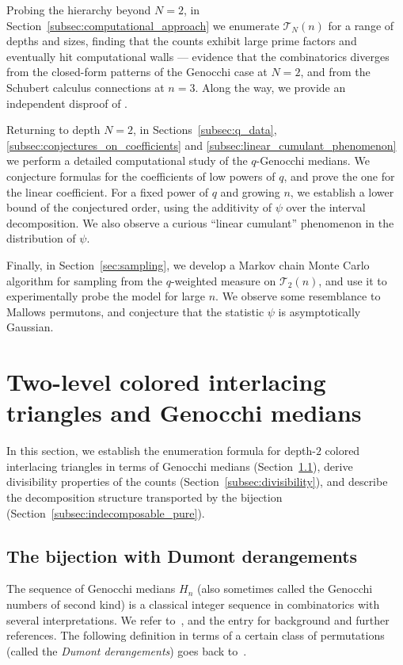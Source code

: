 \documentclass[10pt,a4paper]{amsart}
\numberwithin{equation}{section}
\theoremstyle{definition}
\begin{document}
Probing the hierarchy beyond $N=2$, in Section~\ref{subsec:computational_approach} we enumerate $\mathcal{T}_N(n)$ for a range of depths and sizes, finding that the counts exhibit large prime factors and eventually hit computational walls --- evidence that the combinatorics diverges from the closed-form patterns of the Genocchi case at $N=2$, and from the Schubert calculus connections at $n=3$.  Along the way, we provide an independent disproof of \cite[Conjecture~A.5]{ABW2023coloured_LLT}.

Returning to depth $N=2$, in Sections~\ref{subsec:q_data}, \ref{subsec:conjectures_on_coefficients} and \ref{subsec:linear_cumulant_phenomenon} we perform a detailed computational study of the $q$-Genocchi medians.  We conjecture formulas for the coefficients of low powers of $q$, and prove the one for the linear coefficient.  For a fixed power of $q$ and growing $n$, we establish a lower bound of the conjectured order, using the additivity of $\psi$ over the interval decomposition.  We also observe a curious ``linear cumulant'' phenomenon in the distribution of $\psi$.

Finally, in Section~\ref{sec:sampling}, we develop a Markov chain Monte Carlo algorithm
for sampling from the $q$-weighted measure on $\mathcal{T}_2(n)$, and use it to
experimentally probe the model for large $n$.
We observe some resemblance to Mallows permutons, and conjecture that the
statistic $\psi$ is asymptotically Gaussian.

\section{Two-level colored interlacing triangles and Genocchi medians}
\label{sec:genocchi_case}

In this section, we establish the enumeration formula for depth-$2$ colored
interlacing triangles in terms of Genocchi medians
(Section~\ref{subsec:dumont_bijection}), derive divisibility properties of the
counts (Section~\ref{subsec:divisibility}), and describe the decomposition
structure transported by the bijection
(Section~\ref{subsec:indecomposable_pure}).

\subsection{The bijection with Dumont derangements}
\label{subsec:dumont_bijection}

The sequence of Genocchi medians $H_n$ (also sometimes called the Genocchi
numbers of second kind) is a classical integer sequence in combinatorics with
several interpretations.
We refer to~\mbox{\cite{Dumont1974,DumontRandrianarivony1994}}, and the entry
\cite[A005439]{OEIS} for background and further references.
The following definition in terms of a certain class of permutations (called the
\emph{Dumont derangements}) goes back to~\cite{Dumont1974}.
\end{document}
